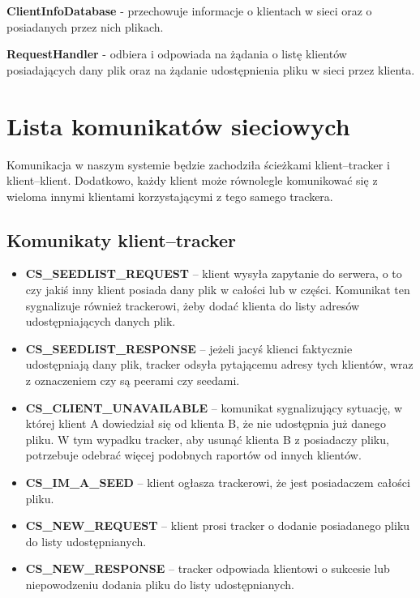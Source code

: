 \documentclass[11pt]{article}
\begin{document}
\textbf{ClientInfoDatabase} - przechowuje informacje o klientach w sieci oraz o posiadanych przez nich plikach.


\textbf{RequestHandler} - odbiera i odpowiada na żądania o listę klientów posiadających dany plik oraz na żądanie udostępnienia pliku w sieci przez klienta.

\section{Lista komunikatów sieciowych}
Komunikacja w naszym systemie będzie zachodziła ścieżkami klient--tracker i klient--klient. Dodatkowo, każdy klient może równolegle komunikować się z wieloma innymi klientami korzystającymi z tego samego trackera.
\subsection{Komunikaty klient--tracker}
\begin{itemize}
\item \textbf{CS\_SEEDLIST\_REQUEST} -- klient wysyła zapytanie do serwera, o to czy jakiś inny klient posiada dany plik w całości lub w części. Komunikat ten sygnalizuje również trackerowi, żeby dodać klienta do listy adresów udostępniających danych plik.
\item \textbf{CS\_SEEDLIST\_RESPONSE} -- jeżeli jacyś klienci faktycznie udostępniają dany plik, tracker odsyła pytającemu adresy tych klientów, wraz z oznaczeniem czy są peerami czy seedami.
\item \textbf{CS\_CLIENT\_UNAVAILABLE} -- komunikat sygnalizujący sytuację, w której klient A dowiedział się od klienta B, że nie udostępnia już danego pliku. W tym wypadku tracker, aby usunąć klienta B z posiadaczy pliku, potrzebuje odebrać więcej podobnych raportów od innych klientów.
\item \textbf{CS\_IM\_A\_SEED} -- klient ogłasza trackerowi, że jest posiadaczem całości pliku.
\item \textbf{CS\_NEW\_REQUEST} -- klient prosi tracker o dodanie posiadanego pliku do listy udostępnianych.
\item \textbf{CS\_NEW\_RESPONSE} -- tracker odpowiada klientowi o sukcesie lub niepowodzeniu dodania pliku do listy udostępnianych.
\end{itemize}
\end{document}
